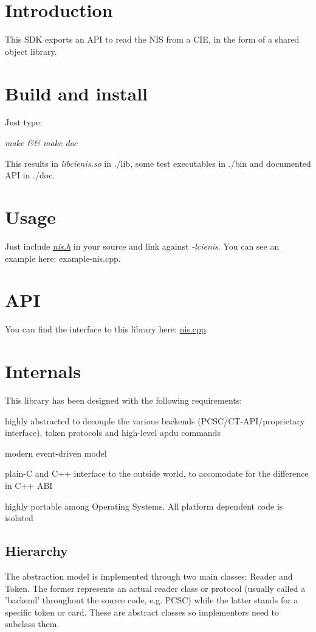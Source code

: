 \hypertarget{index_sec-intro}{}\section{Introduction}\label{index_sec-intro}
This S\-D\-K exports an A\-P\-I to read the N\-I\-S from a C\-I\-E, in the form of a shared object library.\hypertarget{index_sec-build-install}{}\section{Build and install}\label{index_sec-build-install}
Just type\-:

{\itshape make \&\& make doc}

This results in {\itshape libcienis.\-so} in {\itshape }./lib, some test executables in {\itshape }./bin and documented A\-P\-I in ./doc.\hypertarget{index_sec-usage}{}\section{Usage}\label{index_sec-usage}
Just include {\itshape \hyperlink{nis_8h_source}{nis.\-h}} in your source and link against {\itshape -\/lcienis}. You can see an example here\-: example-\/nis.\-cpp.\hypertarget{index_sec-api}{}\section{A\-P\-I}\label{index_sec-api}
You can find the interface to this library here\-: \hyperlink{nis_8cpp}{nis.\-cpp}.\hypertarget{index_sec-internals}{}\section{Internals}\label{index_sec-internals}
This library has been designed with the following requirements\-:
\begin{DoxyItemize}
\item highly abstracted to decouple the various backends (P\-C\-S\-C/\-C\-T-\/\-A\-P\-I/proprietary interface), token protocols and high-\/level apdu commands
\item modern event-\/driven model
\item plain-\/\-C and C++ interface to the outside world, to accomodate for the difference in C++ A\-B\-I
\item highly portable among Operating Systems. All platform dependent code is isolated
\end{DoxyItemize}\hypertarget{index_subsec-hierarchy}{}\subsection{Hierarchy}\label{index_subsec-hierarchy}
The abstraction model is implemented through two main classes\-: Reader and Token. The former represents an actual reader class or protocol (usually called a 'backend' throughout the source code, e.\-g. P\-C\-S\-C) while the latter stands for a specific token or card. These are abstract classes so implementors need to subclass them.

